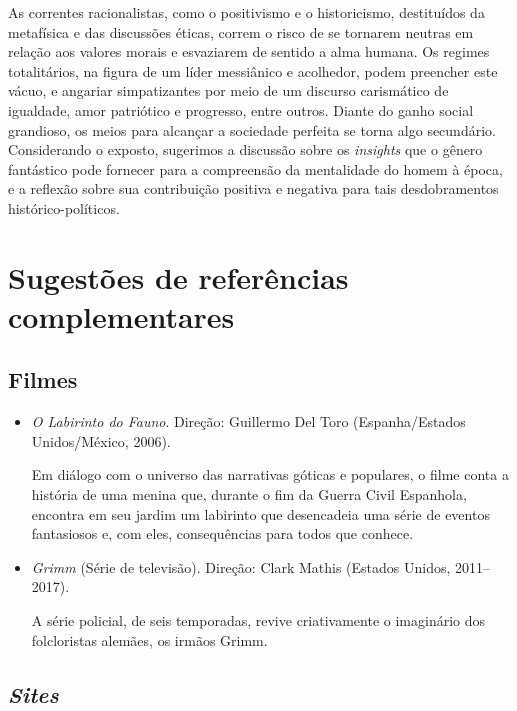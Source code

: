 \documentclass[12pt]{extarticle}
\begin{document}
As correntes racionalistas, como o positivismo e o historicismo,
destituídos da metafísica e das discussões éticas, correm o risco de
se tornarem neutras em relação aos valores morais e esvaziarem de
sentido a alma humana. Os regimes totalitários, na figura de um líder
messiânico e acolhedor, podem preencher este vácuo, e angariar
simpatizantes por meio de um discurso carismático de igualdade, amor
patriótico e progresso, entre outros. Diante do ganho social
grandioso, os meios para alcançar a sociedade perfeita se torna algo
secundário. Considerando o exposto, sugerimos a discussão sobre os
\textit{insights} que o gênero fantástico pode fornecer para a compreensão da
mentalidade do homem à época, e a reflexão sobre sua contribuição
positiva e negativa para tais desdobramentos histórico-políticos.

\section{Sugestões de referências complementares}\label{sugestoes}

\subsection{Filmes}

\begin{itemize}
\item \textit{O Labirinto do Fauno}. Direção: Guillermo Del Toro (Espanha/Estados Unidos/México, 2006).

Em diálogo com o universo das narrativas góticas e populares, o filme conta a história de uma menina 
que, durante o fim da Guerra Civil Espanhola, encontra em seu jardim um labirinto que desencadeia 
uma série de eventos fantasiosos e, com eles, consequências para todos que conhece.

\item \textit{Grimm} (Série de televisão). Direção: Clark Mathis (Estados Unidos, 2011--2017).

A série policial, de seis temporadas, revive criativamente o imaginário dos folcloristas alemães, 
os irmãos Grimm.
\end{itemize}

\subsection{\emph{Sites}}
\end{document}
